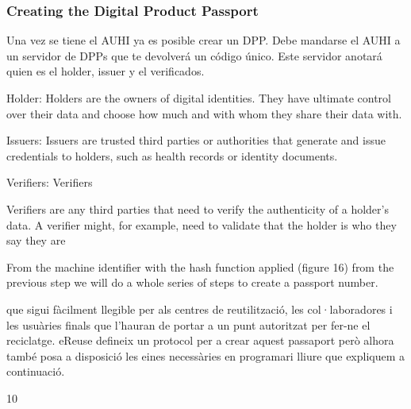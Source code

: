 \documentclass[
]{book}
\begin{document}
\hypertarget{creating-the-digital-product-passport}{%
\subsubsection{Creating the Digital Product Passport}\label{creating-the-digital-product-passport}}

Una vez se tiene el AUHI ya es posible crear un DPP. Debe mandarse el AUHI a un servidor de DPPs que te devolverá un código único. Este servidor anotará quien es el holder, issuer y el verificados.

Holder: Holders are the owners of digital identities. They have ultimate control over their data and choose how much and with whom they share their data with.

Issuers: Issuers are trusted third parties or authorities that generate and issue credentials to holders, such as health records or identity documents.

Verifiers: Verifiers

Verifiers are any third parties that need to verify the authenticity of a holder's data. A verifier might, for example, need to validate that the holder is who they say they are

From the machine identifier with the hash function applied (figure 16) from the previous step we will do a whole series of steps to create a passport number.

que sigui fàcilment llegible per als centres de reutilització, les col·laboradores i les usuàries finals que l'hauran de portar a un punt autoritzat per fer-ne el reciclatge. eReuse defineix un protocol per a crear aquest passaport però alhora també posa a disposició les eines necessàries en programari lliure que expliquem a continuació.

10
\end{document}
